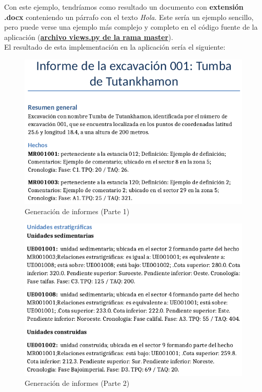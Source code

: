 Con este ejemplo, tendríamos como resultado un documento con \textbf{extensión .docx}
conteniendo un párrafo con el texto \textit{Hola}. Este sería un ejemplo sencillo, pero
puede verse una ejemplo más complejo y completo en el código fuente de la aplicación
(\href{https://github.com/alexespana/TFG/blob/master/code/app/myFindings/views.py}
{\textbf{archivo views.py de la rama master}}). \\

El resultado de esta implementación en la aplicación sería el siguiente:

    \begin{figure}[H]
        \centering
        \includegraphics[scale=0.55]{imagenes/report-generator1.png}
        \caption{Generación de informes (Parte 1)}
        \label{fig:report-generator1}
    \end{figure}

    \begin{figure}[H]
        \centering
        \includegraphics[scale=0.55]{imagenes/report-generator2.png}
        \caption{Generación de informes (Parte 2)}
        \label{fig:report-generator2}
    \end{figure}

